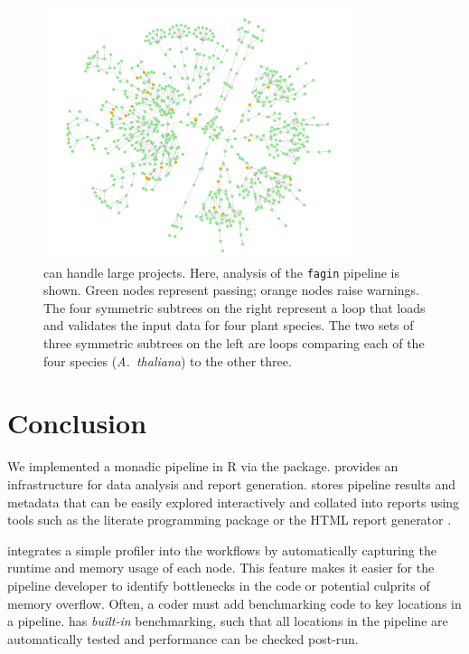 \begin{figure}[htbp]
  \centering
  \includegraphics[width=0.8\textwidth]{Images/rmonad_fagin}
  \caption{ can handle large projects. Here,   analysis of the {\tt fagin} pipeline is shown. Green nodes represent passing; orange nodes raise warnings. The four symmetric subtrees on the right represent a loop that loads and validates the input data for four plant species. The two sets of three symmetric subtrees on the left are loops comparing each of the four species ({\it A.~thaliana}) to the other three.}
  \label{fig:rmonad-fagin}
\end{figure}

\section{Conclusion}

We implemented a monadic pipeline in R via the 
package.  provides an infrastructure for data analysis and
report generation.  stores pipeline results and metadata that
can be easily explored interactively and collated into reports using tools such
as the literate programming package  \citep{knitr} or the HTML
report generator  \citep{gehlenborg2013nozzle}.

 integrates a simple profiler into the workflows by
automatically capturing the runtime and memory usage of each node. This feature
makes it easier for the pipeline developer to identify bottlenecks in the code
or potential culprits of memory overflow. Often, a coder must add benchmarking code to key locations in a pipeline.   has \textit{built-in} benchmarking, such that all locations in the pipeline are automatically tested and performance can be checked post-run.

